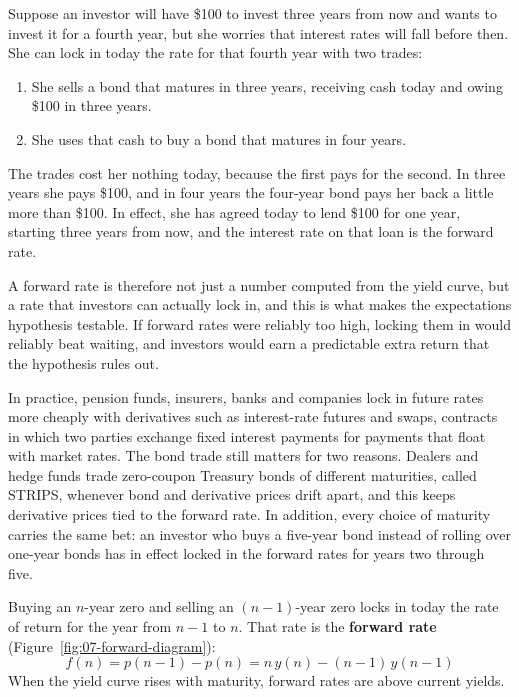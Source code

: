 Suppose an investor will have \$100 to invest three years from now and wants to invest it for a fourth year, but she worries that interest rates will fall before then. She can lock in today the rate for that fourth year with two trades:
\begin{enumerate}
  \item She sells a bond that matures in three years, receiving cash today and owing \$100 in three years.
  \item She uses that cash to buy a bond that matures in four years.
\end{enumerate}
The trades cost her nothing today, because the first pays for the second. In three years she pays \$100, and in four years the four-year bond pays her back a little more than \$100. In effect, she has agreed today to lend \$100 for one year, starting three years from now, and the interest rate on that loan is the forward rate.

A forward rate is therefore not just a number computed from the yield curve, but a rate that investors can actually lock in, and this is what makes the expectations hypothesis testable. If forward rates were reliably too high, locking them in would reliably beat waiting, and investors would earn a predictable extra return that the hypothesis rules out.

In practice, pension funds, insurers, banks and companies lock in future rates more cheaply with derivatives such as interest-rate futures and swaps, contracts in which two parties exchange fixed interest payments for payments that float with market rates. The bond trade still matters for two reasons. Dealers and hedge funds trade zero-coupon Treasury bonds of different maturities, called STRIPS, whenever bond and derivative prices drift apart, and this keeps derivative prices tied to the forward rate. In addition, every choice of maturity carries the same bet: an investor who buys a five-year bond instead of rolling over one-year bonds has in effect locked in the forward rates for years two through five.

Buying an $n$-year zero and selling an $(n-1)$-year zero locks in today the rate of return for the year from $n-1$ to $n$. That rate is the \textbf{forward rate} (Figure~\ref{fig:07-forward-diagram}):
\begin{equation}
  f(n) = p(n-1) - p(n) = n\,y(n) - (n-1)\,y(n-1)
  \label{eq:07-forward}
\end{equation}
When the yield curve rises with maturity, forward rates are above current yields.

